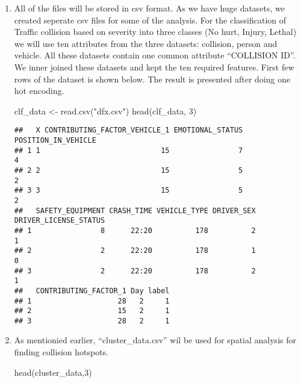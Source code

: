 \documentclass[
]{article}
\newenvironment{Shaded}{\begin{snugshade}}{\end{snugshade}}
\newcommand{\DecValTok}[1]{\textcolor[rgb]{0.00,0.00,0.81}{#1}}
\newcommand{\FunctionTok}[1]{\textcolor[rgb]{0.00,0.00,0.00}{#1}}
\newcommand{\NormalTok}[1]{#1}
\newcommand{\OtherTok}[1]{\textcolor[rgb]{0.56,0.35,0.01}{#1}}
\newcommand{\StringTok}[1]{\textcolor[rgb]{0.31,0.60,0.02}{#1}}
\begin{document}
\begin{enumerate}
\def\labelenumi{\arabic{enumi}.}
\item
  All of the files will be stored in csv format. As we have huge
  datasets, we created seperate csv files for some of the analysis. For
  the classification of Traffic collision based on severity into three
  classes (No hurt, Injury, Lethal) we will use ten attributes from the
  three datasets: collision, person and vehicle. All these datasets
  contain one common attribute ``COLLISION ID''. We inner joined these
  datasets and kept the ten required features. First few rows of the
  dataset is shown below. The result is presented after doing one hot
  encoding.

\begin{Shaded}
\begin{Highlighting}[]
\NormalTok{clf\_data }\OtherTok{\textless{}{-}} \FunctionTok{read.csv}\NormalTok{(}\StringTok{"dfx.csv"}\NormalTok{)}
\FunctionTok{head}\NormalTok{(clf\_data, }\DecValTok{3}\NormalTok{)}
\end{Highlighting}
\end{Shaded}

\begin{verbatim}
##   X CONTRIBUTING_FACTOR_VEHICLE_1 EMOTIONAL_STATUS POSITION_IN_VEHICLE
## 1 1                            15                7                   4
## 2 2                            15                5                   2
## 3 3                            15                5                   2
##   SAFETY_EQUIPMENT CRASH_TIME VEHICLE_TYPE DRIVER_SEX DRIVER_LICENSE_STATUS
## 1                8      22:20          178          2                     1
## 2                2      22:20          178          1                     0
## 3                2      22:20          178          2                     1
##   CONTRIBUTING_FACTOR_1 Day label
## 1                    28   2     1
## 2                    15   2     1
## 3                    28   2     1
\end{verbatim}
\item
  As mentionied earlier, ``cluster\_data.csv'' wil be used for spatial
  analysis for finding collision hotspots.

\begin{Shaded}
\begin{Highlighting}[]
\FunctionTok{head}\NormalTok{(cluster\_data,}\DecValTok{3}\NormalTok{)}
\end{Highlighting}
\end{Shaded}


\end{enumerate}
\end{document}
